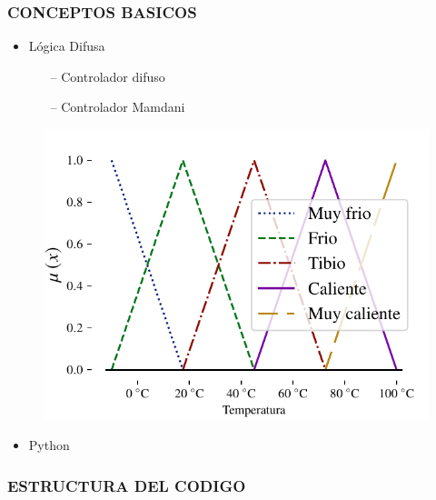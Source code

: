 \documentclass[usenames,dvipsnames]{beamer}
\begin{document}
\begin{frame}
	\frametitle{CONCEPTOS BASICOS}
	\vspace{25pt}

	\begin{itemize}
		\Large
		\setlength\itemsep{1em}
		\item Lógica Difusa
		\begin{itemize}
			\large
			\setlength\itemsep{1em}
			\vspace{1em}
			\item[--] Controlador difuso
			\item[--] Controlador Mamdani 
		\end{itemize}
	\end{itemize}

	\begin{figure}
		\includegraphics[width=0.5\linewidth]{imagenes/FuzzySet.pdf}
	\end{figure}
	\vspace{-20pt}
	\begin{itemize}
		\Large
		\item Python
	\end{itemize}

\end{frame}

\begin{frame}
	\frametitle{ESTRUCTURA DEL CODIGO}

\end{frame}
\end{document}
